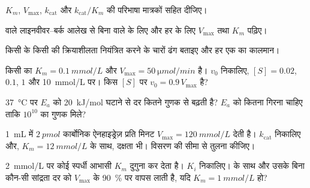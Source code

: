 \begin{exercise}[$\star$]\label{exo:b1:enzymes:2}
$K_m$, $V_{\max}$, $k_{\mathrm{cat}}$ और $k_{\mathrm{cat}}/K_m$ की परिभाषा
मात्रकों सहित दीजिए।
\end{exercise}

\begin{exercise}[$\star$]\label{exo:b1:enzymes:3}
 वाले लाइनवीवर--बर्क आलेख से बिना  वाले  के लिए और हर
 के लिए $V_{\max}$ तथा $K_m$ पढ़िए।
\end{exercise}

\begin{exercise}[$\star$]\label{exo:b1:enzymes:4}
किसी  के किसी  की क्रियाशीलता नियंत्रित करने के चारों ढंग
बताइए और हर एक का कालमान।
\end{exercise}

\begin{exercise}[$\star\star$]\label{exo:b1:enzymes:5}
किसी  का $K_m = \qty{0.1}{mmol/L}$ और $V_{\max} =
\qty{50}{\micro mol/min}$ है। $v_0$ निकालिए, $[S] = 0.02$, $0.1$, $1$
और \qty{10}{mmol/L} पर। किस $[S]$ पर $v_0 = 0.9\,V_{\max}$ है?
\end{exercise}

\begin{exercise}[$\star\star$]\label{exo:b1:enzymes:6}
\qty{37}{\celsius} पर $E_a$ को \qty{20}{kJ/mol} घटाने से दर कितने गुणक
से बढ़ती है? $E_a$ को कितना गिरना चाहिए ताकि $10^{10}$ का गुणक मिले?
\end{exercise}

\begin{exercise}[$\star\star$]\label{exo:b1:enzymes:7}
\qty{1}{mL} में $\qty{2}{pmol}$ कार्बोनिक ऐनहाइड्रेज़ प्रति मिनट
$V_{\max} = \qty{120}{mmol/L}$ देती है। $k_{\mathrm{cat}}$ निकालिए
और, $K_m = \qty{12}{mmol/L}$ के साथ, दक्षता भी। विसरण की सीमा से तुलना
कीजिए।
\end{exercise}

\begin{exercise}[$\star\star$]\label{exo:b1:enzymes:8}
\qty{2}{mmol/L} पर कोई स्पर्धी  आभासी $K_m$ दुगुना कर देता है।
$K_i$ निकालिए।  के साथ और उसके बिना कौन-सी  सांद्रता दर
को $V_{\max}$ के \qty{90}{\%} पर वापस लाती है, यदि
$K_m = \qty{1}{mmol/L}$ हो?
\end{exercise}

